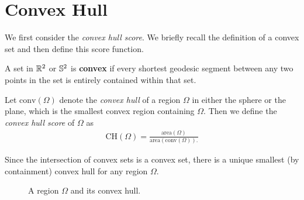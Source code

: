 \section{Convex Hull}\label{sec:ch}
We first consider the \textit{convex hull
score}.  We briefly recall the definition of a convex set and then
define this score function.



\begin{definition}
	A set in $\mathbb{R}^2$ or $\mathbb{S}^2$  is \textbf{convex} if every shortest geodesic segment between any two points in the set is entirely 
	contained within that set.
\end{definition}





\begin{definition}
  Let $\mathrm{conv}(\Omega)$ denote the \textit{convex hull} of
  a region $\Omega$ in either the sphere or the plane, which is the
  smallest convex region containing $\Omega$.  Then we define the
  \textit{convex hull score} of $\Omega$ as 
  \begin{align*}
    \mathrm{CH}(\Omega)=
    \frac{\mathrm{area}(\Omega)}{\mathrm{area}(\mathrm{conv}(\Omega)).}
  \end{align*}
  
  Since the intersection of convex sets is a convex set, there is a unique smallest (by containment) convex hull for any region $\Omega$.
\end{definition}



\begin{figure}[htb]
	\centering
	
	\caption{A region $\Omega$ and its convex hull.}
	\label{fig:ch_example}
\end{figure}

